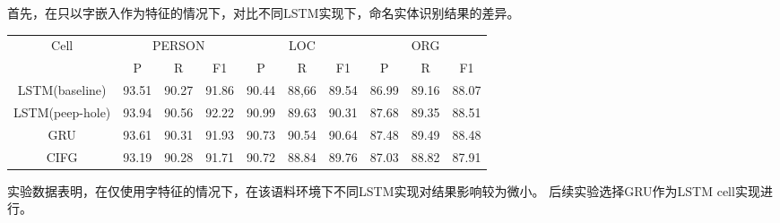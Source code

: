 首先，在只以字嵌入作为特征的情况下，对比不同LSTM实现下，命名实体识别结果的差异。
\begin{table}[H]
    \centering
    \small
    \begin{tabular}{cccccccccc}
        \toprule
            \multirow{2}{*}{Cell} &\multicolumn{3}{c}{PERSON} &\multicolumn{3}{c}{LOC} &\multicolumn{3}{c}{ORG}\\
            \cmidrule(lr){2-4} \cmidrule(lr){5-7} \cmidrule(lr){8-10}
            & P & R & F1 & P & R & F1 & P & R & F1\\
        \midrule
        LSTM(baseline) & 93.51 & 90.27 & 91.86 & 90.44 & 88,66 & 89.54 & 86.99 & 89.16 & 88.07\\
        LSTM(peep-hole) & 93.94 & 90.56 & 92.22 & 90.99 & 89.63 & 90.31 & 87.68 & 89.35 & 88.51\\
        GRU & 93.61 & 90.31 & 91.93 & 90.73 & 90.54 & 90.64 & 87.48 & 89.49 & 88.48\\
        CIFG  & 93.19 & 90.28 & 91.71 & 90.72 & 88.84 & 89.76 & 87.03 & 88.82 & 87.91\\
        \bottomrule
    \end{tabular}
    \label{tab:lstm_cell_comparison}
\end{table}

实验数据表明，在仅使用字特征的情况下，在该语料环境下不同LSTM实现对结果影响较为微小。
后续实验选择GRU作为LSTM cell实现进行。

